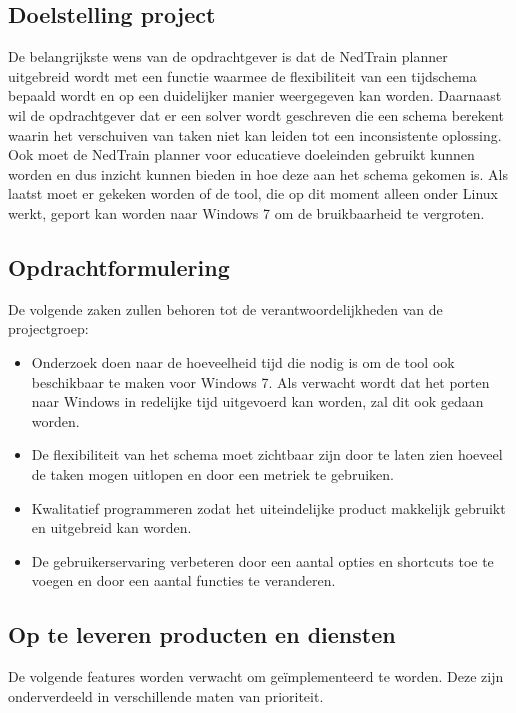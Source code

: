 \subsection{Doelstelling project}
De belangrijkste wens van de opdrachtgever is dat de NedTrain planner uitgebreid wordt met een functie waarmee de flexibiliteit van een tijdschema bepaald wordt en op een duidelijker manier weergegeven kan worden. Daarnaast wil de opdrachtgever dat er een solver wordt geschreven die een schema berekent waarin het verschuiven van taken niet kan leiden tot een inconsistente oplossing. Ook moet de NedTrain planner voor educatieve doeleinden gebruikt kunnen worden en dus inzicht kunnen bieden in hoe deze aan het schema gekomen is. Als laatst moet er gekeken worden of de tool, die op dit moment alleen onder Linux werkt, geport kan worden naar Windows 7 om de bruikbaarheid te vergroten.

\subsection{Opdrachtformulering}
De volgende zaken zullen behoren tot de verantwoordelijkheden van de projectgroep:
\begin{itemize}
	\item Onderzoek doen naar de hoeveelheid tijd die nodig is om de tool ook beschikbaar te maken voor Windows 7. Als verwacht wordt dat het porten naar Windows in redelijke tijd uitgevoerd kan worden, zal dit ook gedaan worden. 
	\item De flexibiliteit van het schema moet zichtbaar zijn door te laten zien hoeveel de taken mogen uitlopen en door een metriek te gebruiken.
	\item Kwalitatief programmeren zodat het uiteindelijke product makkelijk gebruikt en uitgebreid kan worden.
	\item De gebruikerservaring verbeteren door een aantal opties en shortcuts toe te voegen en door een aantal functies te veranderen.
\end{itemize}

\subsection{Op te leveren producten en diensten}
\label{subsec:producten}
De volgende features worden verwacht om ge\"implementeerd te worden. Deze zijn onderverdeeld in verschillende maten van prioriteit. 

